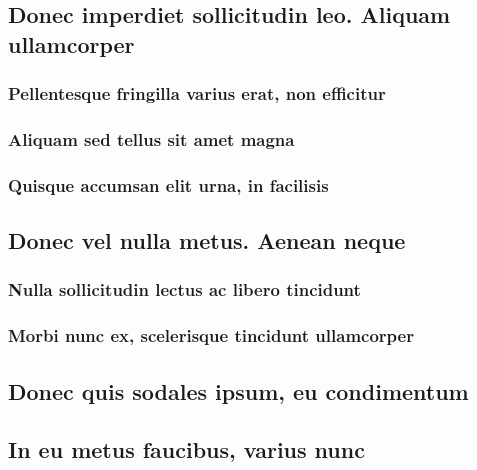 \documentclass[%
  english,%
]{doctorate}
\begin{document}
\lipsum[1-8]

\subsection{Donec imperdiet sollicitudin leo. Aliquam ullamcorper}

\lipsum[1-8]

\subsubsection{Pellentesque fringilla varius erat, non efficitur}

\lipsum[1-8]

\subsubsection{Aliquam sed tellus sit amet magna}

\lipsum[1-8]

\subsubsection{Quisque accumsan elit urna, in facilisis}

\lipsum[1-8]

\subsection{Donec vel nulla metus. Aenean neque}

\lipsum[1-8]

\subsubsection{Nulla sollicitudin lectus ac libero tincidunt}

\lipsum[1-8]

\subsubsection{Morbi nunc ex, scelerisque tincidunt ullamcorper}

\lipsum[1-8]

\subsection{Donec quis sodales ipsum, eu condimentum}

\lipsum[1-8]

\subsection{In eu metus faucibus, varius nunc}
\end{document}
